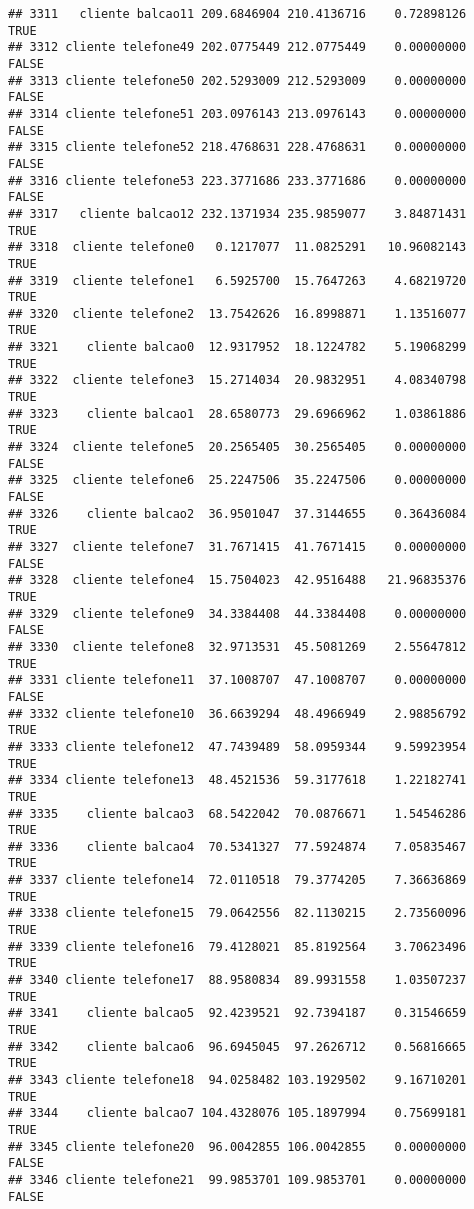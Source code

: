 \documentclass[
]{article}
\begin{document}
\begin{verbatim}
## 3311   cliente balcao11 209.6846904 210.4136716    0.72898126     TRUE
## 3312 cliente telefone49 202.0775449 212.0775449    0.00000000    FALSE
## 3313 cliente telefone50 202.5293009 212.5293009    0.00000000    FALSE
## 3314 cliente telefone51 203.0976143 213.0976143    0.00000000    FALSE
## 3315 cliente telefone52 218.4768631 228.4768631    0.00000000    FALSE
## 3316 cliente telefone53 223.3771686 233.3771686    0.00000000    FALSE
## 3317   cliente balcao12 232.1371934 235.9859077    3.84871431     TRUE
## 3318  cliente telefone0   0.1217077  11.0825291   10.96082143     TRUE
## 3319  cliente telefone1   6.5925700  15.7647263    4.68219720     TRUE
## 3320  cliente telefone2  13.7542626  16.8998871    1.13516077     TRUE
## 3321    cliente balcao0  12.9317952  18.1224782    5.19068299     TRUE
## 3322  cliente telefone3  15.2714034  20.9832951    4.08340798     TRUE
## 3323    cliente balcao1  28.6580773  29.6966962    1.03861886     TRUE
## 3324  cliente telefone5  20.2565405  30.2565405    0.00000000    FALSE
## 3325  cliente telefone6  25.2247506  35.2247506    0.00000000    FALSE
## 3326    cliente balcao2  36.9501047  37.3144655    0.36436084     TRUE
## 3327  cliente telefone7  31.7671415  41.7671415    0.00000000    FALSE
## 3328  cliente telefone4  15.7504023  42.9516488   21.96835376     TRUE
## 3329  cliente telefone9  34.3384408  44.3384408    0.00000000    FALSE
## 3330  cliente telefone8  32.9713531  45.5081269    2.55647812     TRUE
## 3331 cliente telefone11  37.1008707  47.1008707    0.00000000    FALSE
## 3332 cliente telefone10  36.6639294  48.4966949    2.98856792     TRUE
## 3333 cliente telefone12  47.7439489  58.0959344    9.59923954     TRUE
## 3334 cliente telefone13  48.4521536  59.3177618    1.22182741     TRUE
## 3335    cliente balcao3  68.5422042  70.0876671    1.54546286     TRUE
## 3336    cliente balcao4  70.5341327  77.5924874    7.05835467     TRUE
## 3337 cliente telefone14  72.0110518  79.3774205    7.36636869     TRUE
## 3338 cliente telefone15  79.0642556  82.1130215    2.73560096     TRUE
## 3339 cliente telefone16  79.4128021  85.8192564    3.70623496     TRUE
## 3340 cliente telefone17  88.9580834  89.9931558    1.03507237     TRUE
## 3341    cliente balcao5  92.4239521  92.7394187    0.31546659     TRUE
## 3342    cliente balcao6  96.6945045  97.2626712    0.56816665     TRUE
## 3343 cliente telefone18  94.0258482 103.1929502    9.16710201     TRUE
## 3344    cliente balcao7 104.4328076 105.1897994    0.75699181     TRUE
## 3345 cliente telefone20  96.0042855 106.0042855    0.00000000    FALSE
## 3346 cliente telefone21  99.9853701 109.9853701    0.00000000    FALSE

\end{verbatim}
\end{document}
